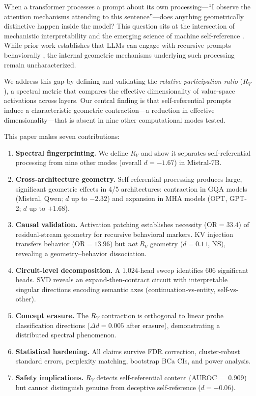 \documentclass{article}
\newcommand{\RV}{R_V}
\newcommand{\dcohen}{d}
\begin{document}
When a transformer processes a prompt about its own processing---``I observe the attention mechanisms attending to this sentence''---does anything geometrically distinctive happen inside the model?
This question sits at the intersection of mechanistic interpretability \citep{elhage2021mathematical, conmy2023towards} and the emerging science of machine self-reference \citep{kadavath2022language, perez2022discovering}.
While prior work establishes that LLMs can engage with recursive prompts behaviorally \citep{chen2024self}, the internal geometric mechanisms underlying such processing remain uncharacterized.

We address this gap by defining and validating the \emph{relative participation ratio} ($\RV$), a spectral metric that compares the effective dimensionality of value-space activations across layers.
Our central finding is that self-referential prompts induce a characteristic geometric contraction---a reduction in effective dimensionality---that is absent in nine other computational modes tested.

This paper makes seven contributions:
\begin{enumerate}
    \item \textbf{Spectral fingerprinting.} We define $\RV$ and show it separates self-referential processing from nine other modes (overall $\dcohen{=}{-}1.67$) in Mistral-7B.
    \item \textbf{Cross-architecture geometry.} Self-referential processing produces large, significant geometric effects in 4/5 architectures: contraction in GQA models (Mistral, Qwen; $\dcohen$ up to $-2.32$) and expansion in MHA models (OPT, GPT-2; $\dcohen$ up to $+1.68$).
    \item \textbf{Causal validation.} Activation patching establishes necessity (OR${=}33.4$) of residual-stream geometry for recursive behavioral markers. KV injection transfers behavior (OR${=}13.96$) but \emph{not} $\RV$ geometry ($\dcohen{=}0.11$, NS), revealing a geometry--behavior dissociation.
    \item \textbf{Circuit-level decomposition.} A 1{,}024-head sweep identifies 606 significant heads. SVD reveals an expand-then-contract circuit with interpretable singular directions encoding semantic axes (continuation-vs-entity, self-vs-other).
    \item \textbf{Concept erasure.} The $\RV$ contraction is orthogonal to linear probe classification directions ($\Delta d{=}0.005$ after erasure), demonstrating a distributed spectral phenomenon.
    \item \textbf{Statistical hardening.} All claims survive FDR correction, cluster-robust standard errors, perplexity matching, bootstrap BCa CIs, and power analysis.
    \item \textbf{Safety implications.} $\RV$ detects self-referential content (AUROC$\,{=}\,$0.909) but cannot distinguish genuine from deceptive self-reference ($\dcohen{=}{-}0.06$).
\end{enumerate}
\end{document}
